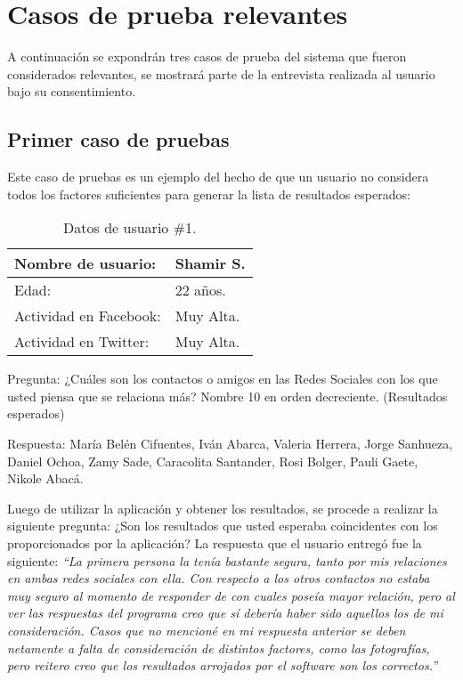 
\chapter{Casos de prueba relevantes}

A continuación se expondrán tres casos de prueba del sistema que fueron considerados relevantes, se mostrará parte de la entrevista realizada al usuario bajo su consentimiento.

\section{Primer caso de pruebas}

Este caso de pruebas es un ejemplo del hecho de que un usuario no considera todos los factores suficientes para generar la lista de resultados esperados:

\begin{table}[H]
\begin{center}
\caption[Datos de usuario \#1.]{Datos de usuario \#1.}
\label{tab:anexo-tab1}
\begin{tabular}{|l|>{\raggedright}p{4cm}|}
\hline 
Nombre de usuario: & Shamir S.\tabularnewline
\hline 
\hline 
Edad: & 22 años.\tabularnewline
\hline 
Actividad en Facebook: & Muy Alta.\tabularnewline
\hline 
Actividad en Twitter: & Muy Alta.\tabularnewline
\hline 
\end{tabular}
\end{center}
\end{table}

Pregunta: ¿Cuáles son los contactos o amigos en las Redes Sociales con los que usted piensa que se relaciona más? Nombre 10 en orden decreciente. (Resultados esperados)

Respuesta: María Belén Cifuentes, Iván Abarca, Valeria Herrera, Jorge Sanhueza, Daniel Ochoa, Zamy Sade, Caracolita Santander, Rosi Bolger, Pauli Gaete, Nikole Abacá.

Luego de utilizar la aplicación y obtener los resultados, se procede a realizar la siguiente pregunta: ¿Son los resultados que usted esperaba coincidentes con los proporcionados por la aplicación? La respuesta que el usuario entregó fue la siguiente: \textit{“La primera persona la tenía bastante segura, tanto por mis relaciones en ambas redes sociales con ella. Con respecto a los otros contactos no estaba muy seguro al momento de responder de con cuales poseía mayor relación, pero al ver las respuestas del programa creo que sí debería haber sido aquellos los de mi consideración. Casos que no mencioné en mi respuesta anterior se deben netamente a falta de consideración de distintos factores, como las fotografías, pero reitero creo que los resultados arrojados por el software son los correctos.”}
 
